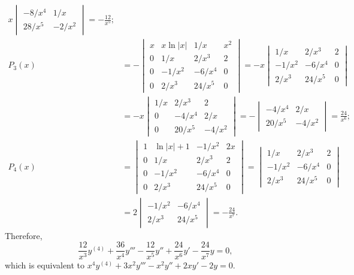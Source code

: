 \documentclass[openany]{book}
\newenvironment{sectionSolutions}{
 \begin{enumerate}[item-label={\thesection.\arabic{enumi}.}]
}{
 \end{enumerate}
}
\begin{document}
\begin{sectionSolutions}
\begin{alist}
\begin{align*}
x\begin{vmatrix}
-8/x^4&1/x\\
28/x^5&-2/x^2
\end{vmatrix}=-\frac{12}{ x^5};\\
P_3(x)&=
-\begin{vmatrix}
x&x\ln|x|&1/x&x^2\\
0&1/x&2/x^3&2\\
0&-1/x^2&-6/x^4&0\\
0&2/x^3&24/x^5&0
\end{vmatrix}=
-x\begin{vmatrix}
1/x&2/x^3&2\\
-1/x^2&-6/x^4&0\\
2/x^3&24/x^5&0
\end{vmatrix}\\
&=-x\begin{vmatrix}
1/x&2/x^3&2\\
0&-4/x^4&2/x\\
0&20/x^5&-4/x^2
\end{vmatrix}=
-\begin{vmatrix}
-4/x^4&2/x\\
20/x^5&-4/x^2
\end{vmatrix}=
\frac{24}{ x^6};\\
P_4(x)&=
\begin{vmatrix}
1&\ln|x|+1&-1/x^2&2x\\
0&1/x&2/x^3&2\\
0&-1/x^2&-6/x^4&0\\
0&2/x^3&24/x^5&0
\end{vmatrix}=
\begin{vmatrix}
1/x&2/x^3&2\\
-1/x^2&-6/x^4&0\\
2/x^3&24/x^5&0
\end{vmatrix}\\
&=2\begin{vmatrix}
-1/x^2&-6/x^4\\
2/x^3&24/x^5
\end{vmatrix}=-\frac{24}{ x^7}.
\end{align*}
Therefore,
\[
\frac{12}{ x^3}y^{(4)}+\frac{36}{ x^4}y'''-\frac{12}{ x^5}y''+\frac{24}{
x^6}y'-\frac{24}{ x^7}y=0,
\]
which is equivalent to
 $x^4y^{(4)}+3x^2y'''-x^2y''+2xy'-2y=0$.


\end{alist}
\end{sectionSolutions}
\end{document}
